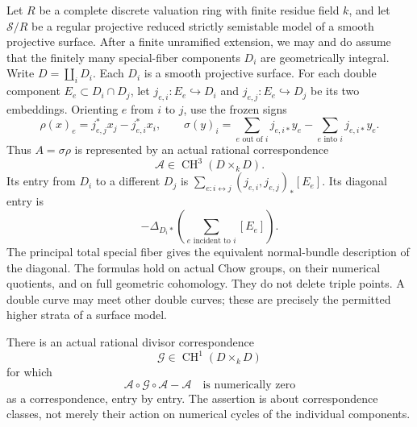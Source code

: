 Let $R$ be a complete discrete valuation ring with finite residue
field $k$, and let $\mathcal S/R$ be a regular projective reduced
strictly semistable model of a smooth projective surface.  After a
finite unramified extension, we may and do assume that the finitely
many special-fiber components $D_i$ are geometrically integral.
Write $D=\coprod_iD_i$.  Each $D_i$ is a smooth projective surface.
For each double component $E_e\subset D_i\cap D_j$, let
$j_{e,i}:E_e\hookrightarrow D_i$ and $j_{e,j}:E_e\hookrightarrow D_j$
be its two embeddings.  Orienting $e$ from $i$ to $j$, use the
frozen signs
\[
 \rho(x)_e=j_{e,j}^*x_j-j_{e,i}^*x_i,
 \qquad
 \sigma(y)_i=\sum_{e\text{ out of }i}j_{e,i*}y_e
              -\sum_{e\text{ into }i}j_{e,i*}y_e.
 \tag{AS20.1}
\]
Thus $A=\sigma\rho$ is represented by an actual rational
correspondence
\[
             \mathcal A\in\operatorname{CH}^{3}(D\times_kD).
 \tag{AS20.2}\label{r20as:Acorrespondence}
\]
Its entry from $D_i$ to a different $D_j$ is
$\sum_{e:i\leftrightarrow j}(j_{e,i},j_{e,j})_*[E_e]$.
Its diagonal entry is
\[
       -\Delta_{D_i*}\left(\sum_{e\text{ incident to }i}[E_e]\right).
 \tag{AS20.3}
\]
The principal total special fiber gives the equivalent normal-bundle
description of the diagonal.  The formulas hold on actual Chow
groups, on their numerical quotients, and on full geometric
cohomology.  They do not delete triple points.  A double curve may
meet other double curves; these are precisely the permitted higher
strata of a surface model.

\begin{lemma}
\label{r20as:numerical-inverse}
There is an actual rational divisor correspondence
\[
             \mathcal G\in\operatorname{CH}^{1}(D\times_kD)
\]
for which
\[
          \mathcal A\circ\mathcal G\circ\mathcal A-\mathcal A
                    \quad\text{is numerically zero}
 \tag{AS20.4}\label{r20as:numerical-identity}
\]
as a correspondence, entry by entry.  The assertion is about
correspondence classes, not merely their action on numerical
cycles of the individual components.
\end{lemma}

